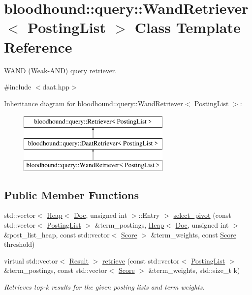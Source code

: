 \hypertarget{classbloodhound_1_1query_1_1WandRetriever}{}\section{bloodhound\+:\+:query\+:\+:Wand\+Retriever$<$ Posting\+List $>$ Class Template Reference}
\label{classbloodhound_1_1query_1_1WandRetriever}


W\+A\+ND (Weak-\/\+A\+ND) query retriever.  




{\ttfamily \#include $<$daat.\+hpp$>$}

Inheritance diagram for bloodhound\+:\+:query\+:\+:Wand\+Retriever$<$ Posting\+List $>$\+:\begin{figure}[H]
\begin{center}
\leavevmode
\includegraphics[height=3.000000cm]{classbloodhound_1_1query_1_1WandRetriever}
\end{center}
\end{figure}
\subsection*{Public Member Functions}
\begin{DoxyCompactItemize}
\item 
std\+::vector$<$ \hyperlink{classbloodhound_1_1Heap}{Heap}$<$ \hyperlink{structbloodhound_1_1Doc}{Doc}, unsigned int $>$\+::Entry $>$ \hyperlink{classbloodhound_1_1query_1_1WandRetriever_a8cf0de41f414aed6e00c28f808faddf6}{select\+\_\+pivot} (const std\+::vector$<$ \hyperlink{classbloodhound_1_1PostingList}{Posting\+List} $>$ \&term\+\_\+postings, \hyperlink{classbloodhound_1_1Heap}{Heap}$<$ \hyperlink{structbloodhound_1_1Doc}{Doc}, unsigned int $>$ \&post\+\_\+list\+\_\+heap, const std\+::vector$<$ \hyperlink{structbloodhound_1_1Score}{Score} $>$ \&term\+\_\+weights, const \hyperlink{structbloodhound_1_1Score}{Score} threshold)
\item 
virtual std\+::vector$<$ \hyperlink{structbloodhound_1_1query_1_1Result}{Result} $>$ \hyperlink{classbloodhound_1_1query_1_1WandRetriever_a5f3068bc363c16c5b7255a925ea5af8c}{retrieve} (const std\+::vector$<$ \hyperlink{classbloodhound_1_1PostingList}{Posting\+List} $>$ \&term\+\_\+postings, const std\+::vector$<$ \hyperlink{structbloodhound_1_1Score}{Score} $>$ \&term\+\_\+weights, std\+::size\+\_\+t k)
\begin{DoxyCompactList}\small\item\em Retrieves top-\/k results for the given posting lists and term weights. \end{DoxyCompactList}\end{DoxyCompactItemize}


